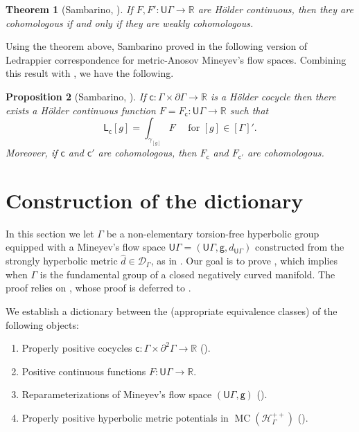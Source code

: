 \documentclass[twoside]{amsart}
\newtheorem{theorem}{Theorem}[section]
\newtheorem{proposition}[theorem]{Proposition}
\theoremstyle{definition}
\numberwithin{equation}{section}
\numberwithin{theorem}{section}
\newcommand{\msf}[1]{\mathsf{#1}}
\newcommand{\R}{\mathbb{R}}
\newcommand{\calD}{\mathcal{D}}
\newcommand{\calH}{\mathcal{H}}
\newcommand{\G}{\Gamma}
\newcommand{\gam}{\gamma}
\newcommand{\ra}{\rightarrow}
\newcommand{\UG}{\msf{U}\G}
\DeclareMathOperator{\MC}{MC}
\newcommand{\pG}{\partial \G}
\begin{document}
\begin{theorem}[Sambarino, {\cite[Theorem~2.2.2]{sambarino.report}}]\label{thm:livsic}
If $F,F':\UG \ra \R$ are H\"older continuous, then they are cohomologous if and only if they are weakly cohomologous.
\end{theorem}



Using the theorem above, Sambarino proved in \cite{sambarino.report} the following version of Ledrappier correspondence for metric-Anosov Mineyev's flow spaces. Combining this result with , we have the following.












\begin{proposition}[{Sambarino, \cite[Proposition~3.1.1]{sambarino.report}}]\label{prop:ledrappier}
    If $\msf{c}:\G \times \pG \ra \R$ is a H\"older cocycle then there exists a H\"older continuous function $F=F_{\msf{c}}:\UG \ra \R$ such that
    \[\msf{L}_{\msf{c}}[g]=\int_{\gam_{[g]}} F\quad \text{ for }[g]\in [\G]'.\]
    Moreover, if $\msf{c}$ and $\msf{c}'$ are cohomologous, then $F_{\msf{c}}$ and $F_{\msf{c}'}$ are cohomologous.
\end{proposition}





\section{Construction of the dictionary}\label{sec:dictionary}

In this section we let $\G$ be a non-elementary torsion-free hyperbolic group equipped with a Mineyev's flow space $\UG=(\msf{U}\G,\msf{g},d_{\UG})$ constructed from the strongly hyperbolic metric $\hat d\in \calD_\G$, as in . 
Our goal is to prove , which implies   when $\G$ is the fundamental group of a closed negatively curved manifold. The proof relies on , whose proof is deferred to .

We establish a dictionary between the (appropriate equivalence classes) of the following objects:
\begin{enumerate}
    \item Properly positive cocycles $\msf{c}:\G \times \partial^2 \G\ra \R$ ().
    \item Positive continuous functions $F:\UG \ra \R$.
    \item Reparameterizations of Mineyev's flow space $(\msf{U}\G,\msf{g})$ ().
    \item Properly positive hyperbolic metric potentials in  $\MC(\calH_\G^{++})$ ().
\end{enumerate}
\end{document}
